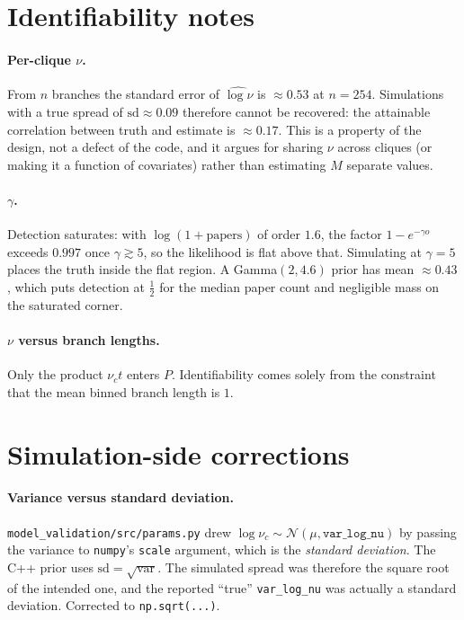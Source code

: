 \documentclass[11pt,a4paper]{article}
\begin{document}
\section{Identifiability notes}
\label{sec:ident}

\paragraph{Per-clique $\nu$.} From $n$ branches the standard error of $\widehat{\log\nu}$ is
$\approx 0.53$ at $n = 254$. Simulations with a true spread of $\mathrm{sd} \approx 0.09$
therefore cannot be recovered: the attainable correlation between truth and estimate is
$\approx 0.17$. This is a property of the design, not a defect of the code, and it argues
for sharing $\nu$ across cliques (or making it a function of covariates) rather than
estimating $M$ separate values.

\paragraph{$\gamma$.} Detection saturates: with $\log(1+\text{papers})$ of order $1.6$, the
factor $1 - e^{-\gamma o}$ exceeds $0.997$ once $\gamma \gtrsim 5$, so the likelihood is
flat above that. Simulating at $\gamma = 5$ places the truth inside the flat region. A
Gamma$(2,4.6)$ prior has mean $\approx 0.43$, which puts detection at $\tfrac12$ for the
median paper count and negligible mass on the saturated corner.

\paragraph{$\nu$ versus branch lengths.} Only the product $\nu_c t$ enters $P$. Identifiability
comes solely from the constraint that the mean binned branch length is $1$.

\section{Simulation-side corrections}
\label{sec:sim}

\paragraph{Variance versus standard deviation.} \texttt{model\_validation/src/params.py} drew
$\log\nu_c \sim \mathcal{N}(\mu, \texttt{var\_log\_nu})$ by passing the variance to
\texttt{numpy}'s \texttt{scale} argument, which is the \emph{standard deviation}. The C++
prior uses $\mathrm{sd} = \sqrt{\mathrm{var}}$. The simulated spread was therefore the square
root of the intended one, and the reported ``true'' \texttt{var\_log\_nu} was actually a
standard deviation. Corrected to \texttt{np.sqrt(...)}.
\end{document}
